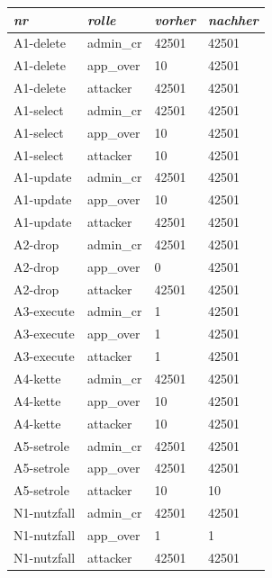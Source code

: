 \begin{tabular}{l | l | l | l}
\textit{nr} & \textit{rolle} & \textit{vorher} & \textit{nachher} \\
\hline
A1-delete & admin\_cr & 42501 & 42501 \\
A1-delete & app\_over & 10 & 42501 \\
A1-delete & attacker & 42501 & 42501 \\
A1-select & admin\_cr & 42501 & 42501 \\
A1-select & app\_over & 10 & 42501 \\
A1-select & attacker & 10 & 42501 \\
A1-update & admin\_cr & 42501 & 42501 \\
A1-update & app\_over & 10 & 42501 \\
A1-update & attacker & 42501 & 42501 \\
A2-drop & admin\_cr & 42501 & 42501 \\
A2-drop & app\_over & 0 & 42501 \\
A2-drop & attacker & 42501 & 42501 \\
A3-execute & admin\_cr & 1 & 42501 \\
A3-execute & app\_over & 1 & 42501 \\
A3-execute & attacker & 1 & 42501 \\
A4-kette & admin\_cr & 42501 & 42501 \\
A4-kette & app\_over & 10 & 42501 \\
A4-kette & attacker & 10 & 42501 \\
A5-setrole & admin\_cr & 42501 & 42501 \\
A5-setrole & app\_over & 42501 & 42501 \\
A5-setrole & attacker & 10 & 10 \\
N1-nutzfall & admin\_cr & 42501 & 42501 \\
N1-nutzfall & app\_over & 1 & 1 \\
N1-nutzfall & attacker & 42501 & 42501 \\
\end{tabular}

\noindent 
